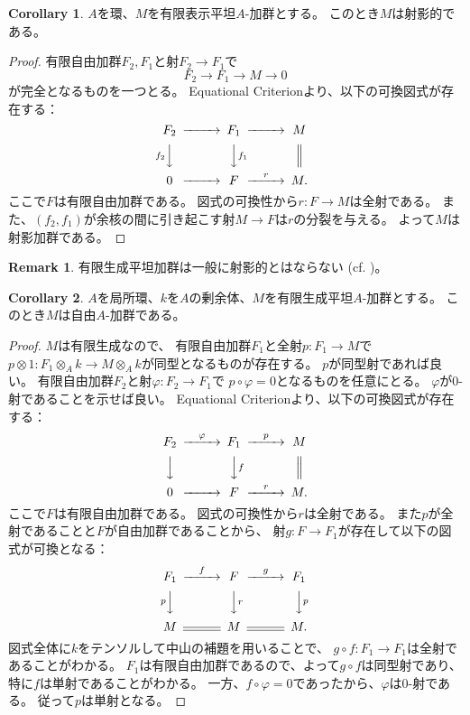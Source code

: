 \documentclass[uplatex]{jsarticle}
\theoremstyle{definition}
\newtheorem{cor}[cor]{Corollary}
\newtheorem{rem}[rem]{Remark}
\theoremstyle{plain}
\begin{document}
\begin{cor}
  \(A\)を環、\(M\)を有限表示平坦\(A\)-加群とする。
  このとき\(M\)は射影的である。
\end{cor}

\begin{proof}
  有限自由加群\(F_2,F_1\)と射\(F_2\to F_1\)で
  \[
  F_2\to F_1\to M\to 0
  \]
  が完全となるものを一つとる。
  Equational Criterionより、以下の可換図式が存在する：
  \[
  \begin{CD}
    F_2 @>>> F_1 @>>> M \\
    @Vf_2VV @VVf_1V @| \\
    0 @>>> F @>r>> M.
  \end{CD}
  \]
  ここで\(F\)は有限自由加群である。
  図式の可換性から\(r:F\to M\)は全射である。
  また、\((f_2,f_1)\)が余核の間に引き起こす射\(M\to F\)は\(r\)の分裂を与える。
  よって\(M\)は射影加群である。
\end{proof}


\begin{rem}
  有限生成平坦加群は一般に射影的とはならない
  (cf. \cite[\href{https://stacks.math.columbia.edu/tag/00NY}{Tag 00NY}]{stacks-project})。
\end{rem}



\begin{cor}\label{cor: fg flat over local is free}
  \(A\)を局所環、\(k\)を\(A\)の剰余体、\(M\)を有限生成平坦\(A\)-加群とする。
  このとき\(M\)は自由\(A\)-加群である。
\end{cor}


\begin{proof}
  \(M\)は有限生成なので、
  有限自由加群\(F_1\)と全射\(p:F_1\to M\)で
  \(p\otimes 1:F_1\otimes_Ak \to M\otimes_Ak\)が同型となるものが存在する。
  \(p\)が同型射であれば良い。
  有限自由加群\(F_2\)と射\(\varphi:F_2\to F_1\)で
  \(p\circ \varphi = 0\)となるものを任意にとる。
  \(\varphi\)が\(0\)-射であることを示せば良い。
  Equational Criterionより、以下の可換図式が存在する：
  \[
  \begin{CD}
    F_2 @>\varphi>> F_1 @>p>> M \\
    @VVV @VVfV @| \\
    0 @>>> F @>r>> M.
  \end{CD}
  \]
  ここで\(F\)は有限自由加群である。
  図式の可換性から\(r\)は全射である。
  また\(p\)が全射であることと\(F\)が自由加群であることから、
  射\(g:F\to F_1\)が存在して以下の図式が可換となる：
  \[
  \begin{CD}
    F_1 @>f>> F @>g>> F_1 \\
    @VpVV @VVrV @VVpV \\
    M @= M @= M.
  \end{CD}
  \]
  図式全体に\(k\)をテンソルして中山の補題を用いることで、
  \(g\circ f:F_1\to F_1\)は全射であることがわかる。
  \(F_1\)は有限自由加群であるので、よって\(g\circ f\)は同型射であり、
  特に\(f\)は単射であることがわかる。
  一方、\(f\circ \varphi = 0\)であったから、\(\varphi\)は\(0\)-射である。
  従って\(p\)は単射となる。
\end{proof}
\end{document}
